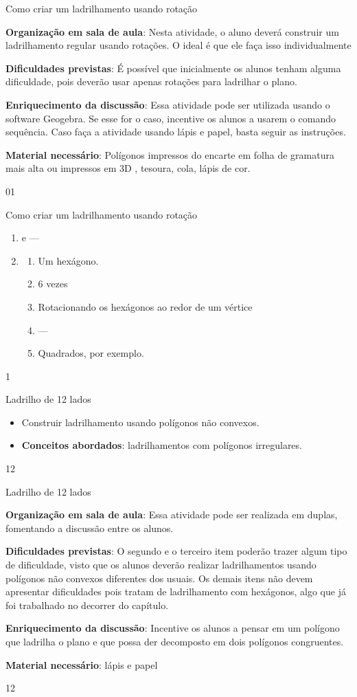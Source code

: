 \begin{sugestions}{Como criar um ladrilhamento usando rotação}
{
	\textbf{Organização em sala de aula}: Nesta atividade, o aluno deverá construir um ladrilhamento regular usando rotações. O ideal é que ele faça isso individualmente

	\textbf{Dificuldades previstas}: É possível que inicialmente os alunos tenham alguma dificuldade, pois deverão usar apenas rotações para ladrilhar o plano.

	\textbf{Enriquecimento da discussão}: Essa atividade pode ser utilizada usando o software Geogebra. Se esse for o caso, incentive os alunos a usarem o comando sequência.
	Caso faça a atividade usando lápis e papel, basta seguir as instruções.

	\textbf{Material necessário}: Polígonos impressos do encarte em folha de gramatura mais alta ou impressos em 3D , tesoura, cola, lápis de cor.
}{0}{1}
\end{sugestions}
\begin{answer}{Como criar um ladrilhamento usando rotação}
{
	\begin{enumerate}
	\item {} e  ---
	\setcounter{enumi}{3}
	\item 
	\begin{enumerate}
	\item Um hexágono.
	\item 6 vezes
	\item Rotacionando os hexágonos ao redor de um vértice
	\item ---
	\item Quadrados, por exemplo.
	\end{enumerate}
	\end{enumerate}
}{1}
\end{answer}
\begin{objectives}{Ladrilho de 12 lados}
{
	\begin{itemize}
	\item Construir ladrilhamento usando polígonos não convexos.
	\item \textbf{Conceitos abordados}: ladrilhamentos com polígonos irregulares.
	\end{itemize}
}{1}{2}
\end{objectives}
\begin{sugestions}{Ladrilho de 12 lados}
{
	\textbf{Organização em sala de aula}: Essa atividade pode ser realizada em duplas, fomentando a discussão entre os alunos. 

	\textbf{Dificuldades previstas}: O segundo e o terceiro item poderão trazer algum tipo de dificuldade, visto que os alunos deverão realizar ladrilhamentos usando polígonos não convexos diferentes dos usuais. Os demais itens não devem apresentar dificuldades pois tratam de ladrilhamento com hexágonos, algo que já foi trabalhado no decorrer do capítulo.

	\textbf{Enriquecimento da discussão}: Incentive os alunos a pensar em um polígono que ladrilha o plano e que possa der decomposto em dois polígonos congruentes. 

	\textbf{Material necessário}: lápis e papel
}{1}{2}
\end{sugestions}
